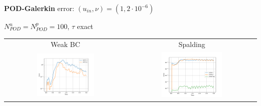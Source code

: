 \documentclass[9pt,compress,t,aspectratio=169]{beamer}
\newcommand{\1}{\begin{pmatrix}
		1\\
		1
\end{pmatrix}}
\newcommand{\highlight}[1]{\textbf{\color{bluemathlab}#1}}
\newcommand{\highlightB}[1]{\textbf{\color{black!15!orangemathlab}#1}}
\begin{document}
\begin{frame}{\highlight{POD-Galerkin} error: $(u_{in},\nu)=(1,2\cdot 10^{-6})$}
	\begin{center}
		$N_{POD}^u=N_{POD}^p=100$, $\tau$ exact
		\begin{tabular}{cc}
			Weak BC& Spalding\\
			\includegraphics[width=0.49\textwidth]{figures/cylinder_turb_weak_errors_RB_vs_time.pdf}&
			\includegraphics[width=0.49\textwidth]{figures/cylinder_turb_spalding_errors_RB_vs_time.pdf}
		\end{tabular}
	\end{center}
\end{frame}




%
\end{document}

